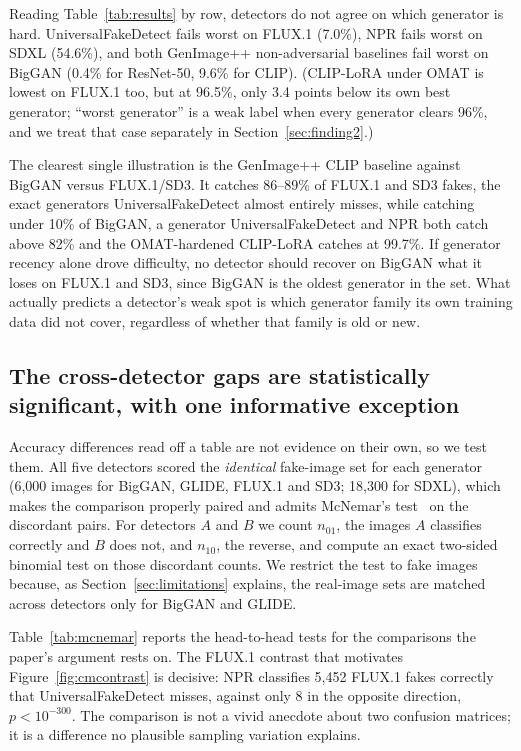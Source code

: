 \documentclass[3p,times,procedia]{elsarticle}
\begin{document}
Reading Table~\ref{tab:results} by row, detectors do not agree on which
generator is hard. UniversalFakeDetect fails worst on FLUX.1 (7.0\%), NPR
fails worst on SDXL (54.6\%), and both GenImage++ non-adversarial
baselines fail worst on BigGAN (0.4\% for ResNet-50, 9.6\% for CLIP).
(CLIP-LoRA under OMAT is lowest on FLUX.1 too, but at 96.5\%, only 3.4
points below its own best generator; ``worst generator'' is a weak label
when every generator clears 96\%, and we treat that case separately in
Section~\ref{sec:finding2}.)

The clearest single illustration is the GenImage++ CLIP baseline against
BigGAN versus FLUX.1/SD3. It catches 86--89\% of FLUX.1 and SD3 fakes, the
exact generators UniversalFakeDetect almost entirely misses, while catching
under 10\% of BigGAN, a generator UniversalFakeDetect and NPR both catch
above 82\% and the OMAT-hardened CLIP-LoRA catches at 99.7\%. If generator
recency alone drove difficulty, no detector should recover on BigGAN what it
loses on FLUX.1 and SD3, since BigGAN is the oldest generator in the set.
What actually predicts a detector's weak spot is which generator family its
own training data did not cover, regardless of whether that family is old or
new.

\subsection{The cross-detector gaps are statistically significant, with one
informative exception}
\label{sec:significance}

Accuracy differences read off a table are not evidence on their own, so we
test them. All five detectors scored the \emph{identical} fake-image set for
each generator (6{,}000 images for BigGAN, GLIDE, FLUX.1 and SD3; 18{,}300
for SDXL), which makes the comparison properly paired and admits McNemar's
test~\cite{mcnemar1947} on the discordant pairs. For detectors $A$ and $B$
we count $n_{01}$, the images $A$ classifies correctly and $B$ does not, and
$n_{10}$, the reverse, and compute an exact two-sided binomial test on
those discordant counts. We restrict the test to fake images because, as
Section~\ref{sec:limitations} explains, the real-image sets are matched
across detectors only for BigGAN and GLIDE.

Table~\ref{tab:mcnemar} reports the head-to-head tests for the comparisons
the paper's argument rests on. The FLUX.1 contrast that motivates
Figure~\ref{fig:cmcontrast} is decisive: NPR classifies 5{,}452 FLUX.1 fakes
correctly that UniversalFakeDetect misses, against only 8 in the opposite
direction, $p < 10^{-300}$. The comparison is not a vivid anecdote about two
confusion matrices; it is a difference no plausible sampling variation
explains.
\end{document}
